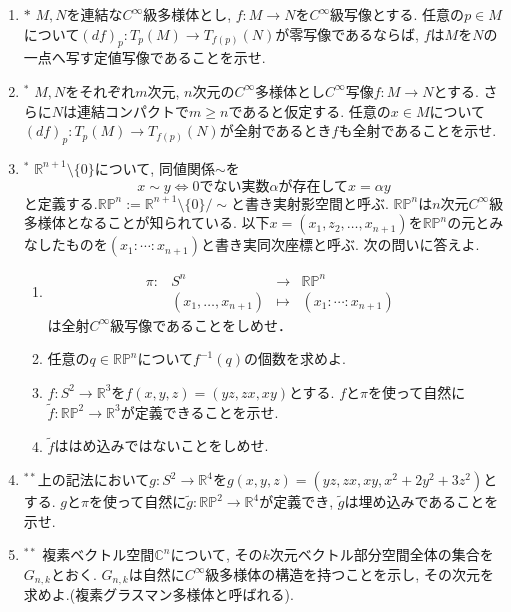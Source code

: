 \documentclass[dvipdfmx,a4paper,11pt]{article}
\newcommand{\R}{\mathbb{R}}
\newcommand{\C}{\mathbb{C}}
\theoremstyle{definition}
\begin{document}
\begin{enumerate}[label=\textbf{問}1.\arabic*]
\item $*$ $M,N$を連結な$C^\infty$級多様体とし, $f : M \rightarrow N$を$C^\infty$級写像とする. 任意の$p \in M$について$(df)_{p} : T_{p}(M) \rightarrow T_{f(p)}(N)$が零写像であるならば, $f$は$M$を$N$の一点へ写す定値写像であることを示せ. 

\item $^{*}$  $M,N$をそれぞれ$m$次元, $n$次元の$C^{\infty}$多様体とし$C^{\infty}$写像$f : M \rightarrow N$とする. さらに$N$は連結コンパクトで$m \ge n$であると仮定する.
任意の$x \in M$について$(df)_{p} : T_{p}(M) \rightarrow T_{f(p)}(N)$が全射であるとき$f$も全射であることを示せ. 

\item $^{*}$  $\R^{n+1} \setminus \{ 0\}$について, 同値関係$\sim$を
	$$
	x \sim y \Leftrightarrow \text{0でない実数$\alpha$が存在して$x = \alpha y$}
	$$
	と定義する.$ \R\mathbb{P}^{n}:= \R^{n+1} \setminus \{ 0\}/\sim$と書き実射影空間と呼ぶ.  $ \R\mathbb{P}^{n}$は$n$次元$C^{\infty}$級多様体となることが知られている.  以下$x= (x_{1}, z_{2}, \ldots, x_{n+1})$を$\R\mathbb{P}^{n}$の元とみなしたものを$(x_{1}: \cdots : x_{n+1})$と書き実同次座標と呼ぶ. 
	次の問いに答えよ.
	\begin{enumerate}
	\item 
	$$
\begin{array}{ccccc}
\pi: &S^{n}& \rightarrow & \R\mathbb{P}^{n}& \\
&(x_{1}, \ldots, x_{n+1}) & \longmapsto & 
(x_{1}: \cdots : x_{n+1})&
\end{array}
$$
は全射$C^{\infty}$級写像であることをしめせ．
	\item 任意の$q \in \R\mathbb{P}^{n}$について$f^{-1}(q)$の個数を求めよ.
	\item $f : S^2 \rightarrow \R^3$を$f(x,y,z)=(yz,zx,xy)$とする. $f$と$\pi$を使って自然に$\tilde{f}: \R\mathbb{P}^{2} \rightarrow \R^3$が定義できることを示せ. 
	\item $\tilde{f}$ははめ込みではないことをしめせ.
	\end{enumerate}
\item$^{**}$上の記法において$g : S^2 \rightarrow \R^4$を$g(x,y,z)=(yz,zx,xy, x^2+2y^2 + 3z^2)$とする. $g$と$\pi$を使って自然に$\tilde{g}: \R\mathbb{P}^{2} \rightarrow \R^4$が定義でき, $\tilde{g}$は埋め込みであることを示せ.

\item$^{**}$ 複素ベクトル空間$\C^{n}$について, その$k$次元ベクトル部分空間全体の集合を$G_{n,k}$とおく. $G_{n,k}$は自然に$C^{\infty}$級多様体の構造を持つことを示し, その次元を求めよ.(複素グラスマン多様体と呼ばれる).


\end{enumerate}
\end{document}
